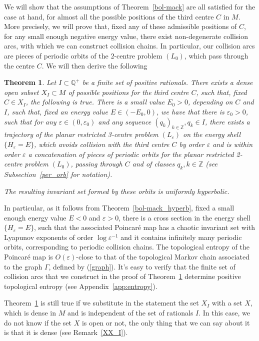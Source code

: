 \documentclass[a4paper]{article}
\newtheorem{theorem}{Theorem}
\begin{document}
We will show that the assumptions of Theorem~\ref{bol-mack} are
all satisfied for the case at hand, for almost all the possible
positions of the third centre $C$ in $M$.  More precisely, we will
prove that, fixed any of these admissible positions of $C$, for any
small enough negative energy value, there exist non-degenerate
collision arcs, with which we can construct collision chains.  In
particular, our collision arcs are pieces of periodic orbits of the
$2$-centre problem $(L_0)$, which pass through the centre $C$.  We
will then derive the following
\begin{theorem}
\label{central_result}
Let $I \subset {\mathbb{Q}}^+$ be a finite set of positive rationals.  There
exists a dense open subset $X_I \subset M$ of possible positions for
the third centre $C$, such that, fixed $C \in X_I$, the following is
true.  There is a small value $E_0>0$, depending on $C$ and $I$, such
that, fixed an energy value $E \in (-E_0,0)$, we have that there is
$\varepsilon_0>0$, such that for any $\varepsilon \in
(0,\varepsilon_0)$ and any sequence $(q_{k})_{k \in {\mathbb{Z}}}, q_{k}\in I$,
there exists a trajectory of the planar restricted 3-centre problem
$(L_{\varepsilon})$ on the energy shell $\{H_{\varepsilon}=E\}$, which
avoids collision with the third centre $C$ by order $\varepsilon$ and
is within order $\varepsilon$ a concatenation of pieces of periodic
orbits for the planar restricted 2-centre problem $(L_0)$, passing
through $C$ and of classes $q_k, k \in {\mathbb{Z}}$ (see
Subsection~\ref{per_orb} for notation).
  
The resulting invariant set formed by these orbits is uniformly
hyperbolic.
\end{theorem}
In particular, as it follows from Theorem~\ref{bol-mack_hyperb}, fixed
a small enough energy value $E<0$ and $\varepsilon >0$, there is a
cross section in the energy shell $\{H_{\varepsilon}=E\}$, such that
the associated Poincar\'e map has a chaotic invariant set with
Lyapunov exponents of order $\log \varepsilon^{-1}$ and it contains
infinitely many periodic orbits, corresponding to periodic collision
chains.
The topological entropy of the Poincar\'e map is
$O(\varepsilon)$-close to that of the topological Markov chain
associated to the graph $\Gamma$, defined by (\ref{graph}).  It's easy
to verify that the finite set of collision arcs that we construct in
the proof of Theorem~\ref{central_result} determine positive
topological entropy (see Appendix~\ref{app:entropy}).

Theorem~\ref{central_result} is still true if we substitute in the
statement the set $X_I$ with a set $X$, which is dense in $M$ and is
independent of the set of rationals $I$.  In this case, we do not know
if the set $X$ is open or not, the only thing that we can say about it
is that it is dense (see Remark~\ref{XX_I}).
\end{document}
